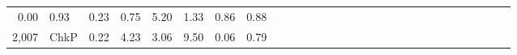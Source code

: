 \documentclass[]{article}
\begin{document}
\begin{longtable}[]{@{}rlrrrrrrrrrrrrrrrrrrrrrrrrrrr@{}}
\begin{minipage}[t]{0.01\columnwidth}
0.00\strut
\end{minipage} & \begin{minipage}[t]{0.01\columnwidth}\raggedleft\strut
0.93\strut
\end{minipage} & \begin{minipage}[t]{0.01\columnwidth}\raggedleft\strut
0.23\strut
\end{minipage} & \begin{minipage}[t]{0.02\columnwidth}\raggedleft\strut
0.75\strut
\end{minipage} & \begin{minipage}[t]{0.01\columnwidth}\raggedleft\strut
5.20\strut
\end{minipage} & \begin{minipage}[t]{0.01\columnwidth}\raggedleft\strut
1.33\strut
\end{minipage} & \begin{minipage}[t]{0.01\columnwidth}\raggedleft\strut
0.86\strut
\end{minipage} & \begin{minipage}[t]{0.01\columnwidth}\raggedleft\strut
0.88\strut
\end{minipage}\tabularnewline
\begin{minipage}[t]{0.01\columnwidth}\raggedleft\strut
2,007\strut
\end{minipage} & \begin{minipage}[t]{0.02\columnwidth}\raggedright\strut
ChkP\strut
\end{minipage} & \begin{minipage}[t]{0.01\columnwidth}\raggedleft\strut
0.22\strut
\end{minipage} & \begin{minipage}[t]{0.02\columnwidth}\raggedleft\strut
4.23\strut
\end{minipage} & \begin{minipage}[t]{0.02\columnwidth}\raggedleft\strut
3.06\strut
\end{minipage} & \begin{minipage}[t]{0.02\columnwidth}\raggedleft\strut
9.50\strut
\end{minipage} & \begin{minipage}[t]{0.01\columnwidth}\raggedleft\strut
0.06\strut
\end{minipage} & \begin{minipage}[t]{0.01\columnwidth}\raggedleft\strut
0.79\strut
\end{minipage} & \begin{minipage}[t]{0.01\columnwidth}\raggedleft\strut

\end{minipage}
\end{longtable}
\end{document}
